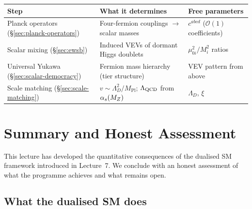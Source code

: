 \documentclass[11pt,a4paper]{article}
\begin{document}
\begin{center}
\renewcommand{\arraystretch}{1.3}
\begin{tabular}{@{}l l l@{}}
\toprule
\textbf{Step} & \textbf{What it determines} & \textbf{Free parameters} \\
\midrule
Planck operators (\S\ref{sec:planck-operators})
  & Four-fermion couplings $\to$ scalar masses
  & $c^{abcd}$ ($\mathcal{O}(1)$ coefficients) \\
Scalar mixing (\S\ref{sec:ewsb})
  & Induced VEVs of dormant Higgs doublets
  & $\mu_{0i}^2 / M_i^2$ ratios \\
Universal Yukawa (\S\ref{sec:scalar-democracy})
  & Fermion mass hierarchy (tier structure)
  & VEV pattern from above \\
Scale matching (\S\ref{sec:scale-matching})
  & $v \sim \Lambda_D^2/M_{\text{Pl}}$; $\Lambda_{\mathrm{QCD}}$ from $\alpha_s(M_Z)$
  & $\Lambda_D$, $\xi$ \\
\bottomrule
\end{tabular}
\end{center}


\section{Summary and Honest Assessment}
\label{sec:summary-assessment}

This lecture has developed the quantitative consequences of the
dualised SM framework introduced in Lecture~7.  We conclude with an
honest assessment of what the programme achieves and what remains open.

\subsection{What the dualised SM does}
\end{document}
